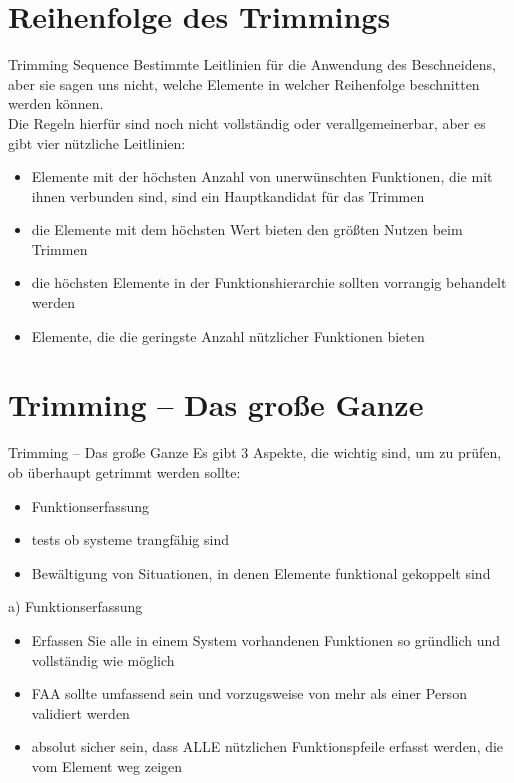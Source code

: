 \documentclass{beamer}
\begin{document}
	
	\section{Reihenfolge des Trimmings}
	
	\begin{frame}{Trimming Sequence}
		Bestimmte Leitlinien für die Anwendung des Beschneidens, aber sie sagen uns nicht, welche Elemente in welcher Reihenfolge beschnitten werden können.\\
		Die Regeln hierfür sind noch nicht vollständig oder verallgemeinerbar, aber es gibt vier nützliche Leitlinien:
		\begin{itemize}
			\item Elemente mit der höchsten Anzahl von unerwünschten Funktionen, die mit ihnen verbunden sind, sind ein Hauptkandidat für das Trimmen
			\item die Elemente mit dem höchsten Wert bieten den größten Nutzen beim Trimmen
			\item die höchsten Elemente in der Funktionshierarchie sollten vorrangig behandelt werden
			\item Elemente, die die geringste Anzahl nützlicher Funktionen bieten
		\end{itemize}
	\end{frame}
	
	\section{Trimming – Das große Ganze}

	\begin{frame}{Trimming – Das große Ganze}
		Es gibt 3 Aspekte, die wichtig sind, um zu prüfen, ob überhaupt getrimmt werden sollte:
		\begin{itemize}
			\item[a)] Funktionserfassung
            \item[b)] tests ob systeme trangfähig sind
            \item[c)] Bewältigung von Situationen, in denen Elemente funktional gekoppelt sind
		\end{itemize}
	\end{frame}

	\begin{frame}{a) Funktionserfassung}
		\begin{itemize}
			\item Erfassen Sie alle in einem System vorhandenen Funktionen so gründlich und vollständig wie möglich
			\item FAA sollte umfassend sein und vorzugsweise von mehr als einer Person validiert werden
			\item absolut sicher sein, dass ALLE nützlichen Funktionspfeile erfasst werden, die vom Element weg zeigen
		\end{itemize}
	\end{frame}
\end{document}
